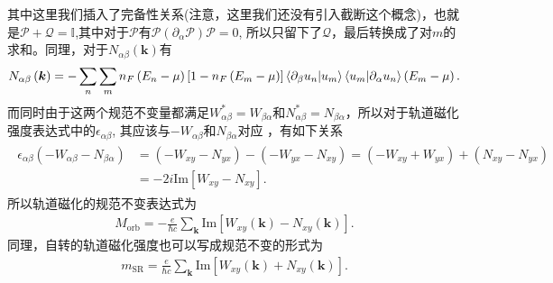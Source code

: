 \documentclass[10pt, oneside]{article}
\newcommand{\pa}{\partial}
\newcommand{\mr}[1]{\mathrm{#1}}
\newcommand{\p}[1]{\left(#1\right)}
\newcommand{\bb}[1]{\left[#1\right]}
\begin{document}
其中这里我们插入了完备性关系(注意，这里我们还没有引入截断这个概念)，也就是\(\mathcal{P} + \mathcal{Q} = \mathbb{I}\),其中对于\(\mathcal{P}\)有\(\mathcal{P} \p{\pa_{\alpha} \mathcal{P}} \mathcal{P} = 0\), 所以只留下了\(\mathcal{Q}\)，最后转换成了对\(m\)的求和。同理，对于\(N_{\alpha \beta} \p{\bm{k}}\)有
\begin{align}
	N_{\alpha \beta} \p{\bm{k}} = - \sum_{n} \sum_{m} n_F \p{E_n - \mu} \bb{1 - n_F \p{E_m - \mu}} \braket{\pa_{\beta} u_n | u_m} \braket{u_{m} | \pa_{\alpha} u_n} \p{E_m - \mu}.
\end{align}
而同时由于这两个规范不变量都满足\(W^{*}_{\alpha \beta} = W_{\beta \alpha}\)和\(N^{*}_{\alpha \beta} = N_{\beta \alpha}\)，所以对于轨道磁化强度表达式中的\(\epsilon_{\alpha \beta}\), 其应该与\(-W_{\alpha \beta}\)和\(N_{\beta \alpha}\)对应 ，有如下关系
\begin{align}
	\begin{split}
		\epsilon_{\alpha \beta} \p{ - W_{\alpha \beta} - N_{\beta \alpha}} &= \p{-W_{xy} - N_{yx}} - \p{- W_{yx} - N_{xy}}=  \p{ - W_{xy} + W_{yx}} + \p{N_{xy}  - N_{yx}}\\
		& =  - 2 i \mr{Im} \bb{W_{xy} - N_{xy}}.
	\end{split}
\end{align}
所以轨道磁化的规范不变表达式为
\begin{align}
	M_{\mr{orb}} = - \frac{e}{\hbar c} \sum_{\bm{k}} \mr{Im} \bb{W_{xy} \p{\bm{k}} - N_{xy} \p{\bm{k}}}.
\end{align}
同理，自转的轨道磁化强度也可以写成规范不变的形式为
\begin{align}
	m_{\mr{SR}} = \frac{e}{\hbar c} \sum_{\bm{k}} \mr{Im} \bb{W_{xy} \p{\bm{k}} + N_{xy} \p{\bm{k}}}.
\end{align}
\end{document}
